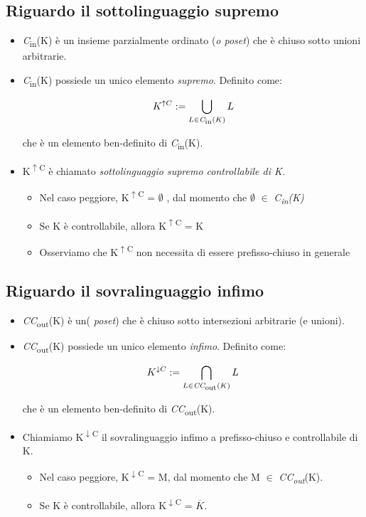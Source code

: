 \documentclass[a4paper]{article}
\begin{document}
\subsection{Riguardo il sottolinguaggio supremo}
\begin{itemize}
\item \textit{C}\textsubscript{in}(K) è un insieme parzialmente ordinato (\textit{o poset}) che è chiuso sotto unioni arbitrarie.
\item \textit{C}\textsubscript{in}(K) possiede un unico elemento \textit{supremo}. Definito come:
\begin{center}
\[ {K}^{\uparrow C} :=   \bigcup_{L \in \textit{C}\textsubscript{in}(K)} L \]
\end{center}
che è un elemento ben-definito di \textit{C}\textsubscript{in}(K).
\item K\textsuperscript{$\uparrow$C} è chiamato \textit{sottolinguaggio supremo controllabile di K.}
\begin{itemize}
\item Nel caso peggiore, K\textsuperscript{$\uparrow$C} = $\emptyset$ , dal momento che $\emptyset$ $\in$ \textit{C\textsubscript{in}(K)}
\item Se K è controllabile, allora K\textsuperscript{$\uparrow$C} = K 
\item Osserviamo che K\textsuperscript{$\uparrow$C} non necessita di essere prefisso-chiuso in generale
\end{itemize}
\end{itemize}
\subsection{Riguardo il sovralinguaggio infimo}
\begin{itemize}
\item \textit{CC}\textsubscript{out}(K) è un(\textit{ poset}) che è chiuso sotto intersezioni arbitrarie (e unioni).
\item \textit{CC}\textsubscript{out}(K) possiede un unico elemento \textit{infimo}. Definito come:
\begin{center}
\[ {K}^{\downarrow C} :=   \bigcap_{L \in \textit{CC}\textsubscript{out}(K)} L \]
\end{center}
che è un elemento ben-definito di \textit{CC}\textsubscript{out}(K).
\item Chiamiamo K\textsuperscript{$\downarrow$C} il sovralinguaggio infimo a prefisso-chiuso e controllabile di K.
\begin{itemize}
\item Nel caso peggiore, K\textsuperscript{$\downarrow$C} = M, dal momento che M $\in$ \textit{CC\textsubscript{out}}(K).
\item Se K è controllabile, allora K\textsuperscript{$\downarrow$C} = $\overline{K}$.
\end{itemize}
\end{itemize}
\end{document}

